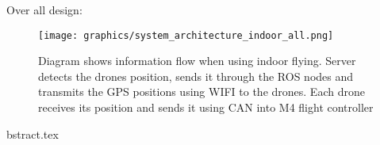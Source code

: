 Over all design:
\begin{figure}[H]
    \center
    \texttt{[image: graphics/system\_architecture\_indoor\_all.png]}
    \caption{Diagram shows information flow when using indoor flying. Server detects the drones position, sends it through the ROS nodes and transmits the GPS positions using WIFI to the drones. Each drone receives its position and sends it using CAN into M4 flight controller}
    \label{fig:PCB_block}
\end{figure}
bstract.tex
